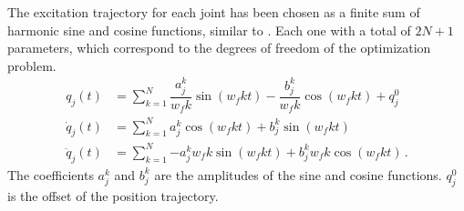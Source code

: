\documentclass[letterpaper, 10 pt, conference]{ieeeconf}
\begin{document}
The excitation trajectory for each joint has been chosen as a finite sum of harmonic sine and cosine functions, similar to \cite{Swevers2007,Kubus2008}. Each one with a total of $2N + 1$ parameters, which correspond to the degrees of freedom of the optimization problem.
\begin{align}
  q_{j}\left(t\right) &= \sum_{k=1}^{N}{\dfrac{a_{j}^{k}}{w_{f}k}\sin\left( w_{f}kt \right) - \dfrac{b_{j}^{k}}{{w_{f}k}}\cos\left( w_{f}kt \right)} + q_{j}^{0} \\
  \dot{q}_{j}\left(t\right) &= \sum_{k=1}^{N}{a_{j}^{k}\cos\left( w_{f}kt \right) + b_{j}^{k}\sin\left( w_{f}kt \right)} \\
  \ddot{q}_{j}\left(t\right) &= \sum_{k=1}^{N}{-a_{j}^{k}w_{f}k\sin\left( w_{f}kt \right) + b_{j}^{k}w_{f}k\cos\left( w_{f}kt \right)} \, .
\end{align}
The coefficients $a_{j}^{k}$ and $b_{j}^{k}$ are the amplitudes of the sine and cosine functions. $q_{j}^{0}$ is the offset of the position trajectory.



\end{document}
